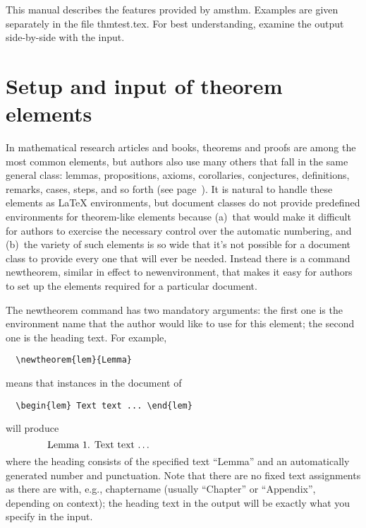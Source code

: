 \documentclass[11pt,twoside]{article}
\providecommand{\qq}[1]{\textquotedblleft#1\textquotedblright}
\newcommand{\ntt}{%
  \fontfamily\ttdefault \fontseries\mddefault \fontshape\updefault
  \selectfont
}
\DeclareRobustCommand{\cn}[1]{{\ntt\bslchar#1}}
\DeclareRobustCommand{\pkg}[1]{{\ntt#1}}
\DeclareRobustCommand{\fn}[1]{{\ntt#1}}
\def\latex/{{\protect\LaTeX}}
\begin{document}
This manual describes the features provided by \pkg{amsthm}.  Examples
are given separately in the file \fn{thmtest.tex}.  For best understanding,
examine the output side-by-side with the input.


\section{Setup and input of theorem elements}

In mathematical research articles and books, theorems
and proofs are among the most common elements, but authors
also use many others that fall in the same general class: lemmas,
propositions, axioms, corollaries, conjectures, definitions, remarks,
cases, steps, and so forth (see page~\pageref{thmstyle:list}).
It is natural to handle these elements as
\latex/ environments, but document classes do not
provide predefined environments for theorem-like elements because
(a)~that would make it difficult for authors to exercise the necessary
control over the automatic numbering, and (b)~the variety of such
elements is so wide that it's not possible for a document class to
provide every one that will ever be needed. Instead there is a command
\cn{newtheorem}, similar in effect to \cn{newenvironment}, that makes it
easy for authors to set up the elements required for a particular
document.

The \cn{newtheorem} command has two mandatory arguments: the first one
is the environment name that the author would like to use for this
element; the second one is the heading text. For example,
\begin{verbatim}
  \newtheorem{lem}{Lemma}
\end{verbatim}
means that instances in the document of
\begin{verbatim}
  \begin{lem} Text text ... \end{lem}
\end{verbatim}
will produce
\[\makebox[.8\columnwidth]{%
  \textbf{Lemma 1.} \textit{Text text \dots}\hfill}\]
where the heading consists of the specified text \qq{Lemma} and an
automatically generated number and punctuation.  Note that there are
no fixed text assignments as there are with, e.g., \cn{chaptername}
(usually ``Chapter'' or ``Appendix'', depending on context); the heading
text in the output will be exactly what you specify in the input.
\end{document}

